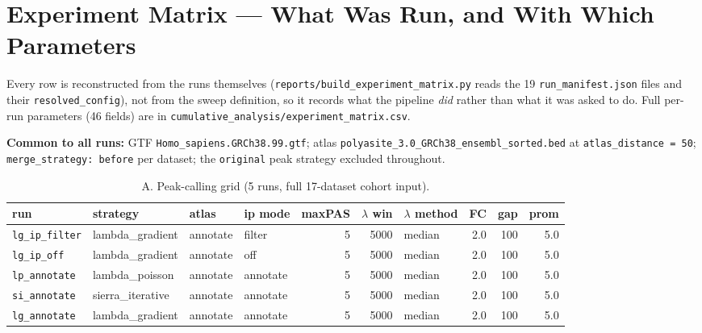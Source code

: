 \documentclass[11pt,a4paper]{article}
\begin{document}
\section{Experiment Matrix --- What Was Run, and With Which Parameters}
\label{sec:matrix}

Every row is reconstructed from the runs themselves
(\texttt{reports/build\_experiment\_matrix.py} reads the 19
\texttt{run\_manifest.json} files and their \texttt{resolved\_config}), not from
the sweep definition, so it records what the pipeline \emph{did} rather than what
it was asked to do. Full per-run parameters (46 fields) are in
\texttt{cumulative\_analysis/experiment\_matrix.csv}.

\textbf{Common to all runs:} GTF \texttt{Homo\_sapiens.GRCh38.99.gtf}; atlas
\texttt{polyasite\_3.0\_GRCh38\_ensembl\_sorted.bed} at
\texttt{atlas\_distance = 50}; \texttt{merge\_strategy: before} per dataset; the
\texttt{original} peak strategy excluded throughout.

\begin{table}[htbp]
  \centering \small
  \begin{tabular}{llllrrlrrr}
    \toprule
    run & strategy & atlas & ip mode & maxPAS & $\lambda$ win & $\lambda$ method & FC & gap & prom \\
    \midrule
    \texttt{lg\_ip\_filter} & lambda\_gradient & annotate & filter & 5 & 5000 & median & 2.0 & 100 & 5.0 \\
    \texttt{lg\_ip\_off} & lambda\_gradient & annotate & off & 5 & 5000 & median & 2.0 & 100 & 5.0 \\
    \texttt{lp\_annotate} & lambda\_poisson & annotate & annotate & 5 & 5000 & median & 2.0 & 100 & 5.0 \\
    \texttt{si\_annotate} & sierra\_iterative & annotate & annotate & 5 & 5000 & median & 2.0 & 100 & 5.0 \\
    \texttt{lg\_annotate} & lambda\_gradient & annotate & annotate & 5 & 5000 & median & 2.0 & 100 & 5.0 \\
    \bottomrule
  \end{tabular}
  \caption{A. Peak-calling grid (5 runs, full 17-dataset cohort input).}
  \label{tab:matrix_peak}
\end{table}
\end{document}
